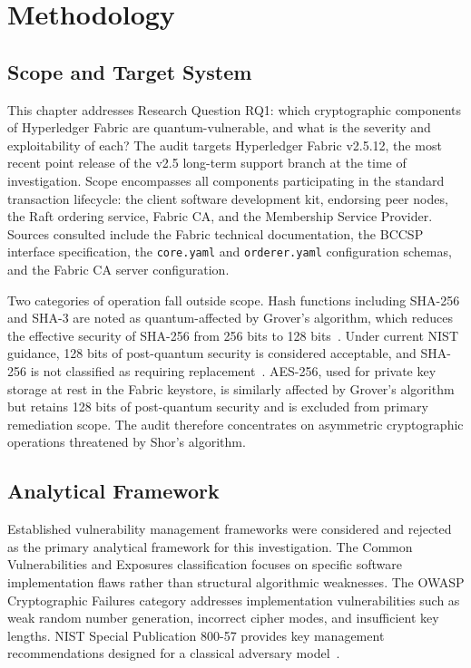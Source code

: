 \documentclass[conference]{IEEEtran}
\begin{document}
\section{Methodology}
\label{sec:tm_method}

\subsection{Scope and Target System}

This chapter addresses Research Question RQ1: which cryptographic
components of Hyperledger Fabric are quantum-vulnerable, and what is
the severity and exploitability of each? The audit targets Hyperledger
Fabric v2.5.12, the most recent point release of the v2.5 long-term
support branch at the time of investigation. Scope encompasses all
components participating in the standard transaction lifecycle: the
client software development kit, endorsing peer nodes, the Raft ordering
service, Fabric CA, and the Membership Service Provider. Sources
consulted include the Fabric technical documentation, the BCCSP interface
specification, the \texttt{core.yaml} and \texttt{orderer.yaml}
configuration schemas, and the Fabric CA server configuration.

Two categories of operation fall outside scope. Hash functions including
SHA-256 and SHA-3 are noted as quantum-affected by Grover's algorithm,
which reduces the effective security of SHA-256 from 256 bits to 128
bits~\cite{grover1996}. Under current NIST guidance, 128 bits of
post-quantum security is considered acceptable, and SHA-256 is not
classified as requiring replacement~\cite{nist_sp80057}. AES-256,
used for private key storage at rest in the Fabric keystore, is similarly
affected by Grover's algorithm but retains 128 bits of post-quantum
security and is excluded from primary remediation scope. The audit
therefore concentrates on asymmetric cryptographic operations threatened
by Shor's algorithm.

\subsection{Analytical Framework}

Established vulnerability management frameworks were considered and
rejected as the primary analytical framework for this investigation.
The Common Vulnerabilities and Exposures classification focuses on
specific software implementation flaws rather than structural algorithmic
weaknesses. The OWASP Cryptographic Failures category addresses
implementation vulnerabilities such as weak random number generation,
incorrect cipher modes, and insufficient key lengths. NIST Special
Publication 800-57 provides key management recommendations designed for a
classical adversary model~\cite{nist_sp80057}.
\end{document}
